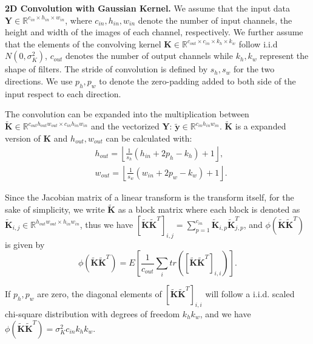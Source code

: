 \documentclass[10pt,journal,compsoc]{IEEEtran}
\begin{document}
\textbf{2D Convolution with Gaussian Kernel.} We assume that the input data $\mathbf{Y}\in \mathbb{R}^{c_{in} \times h_{in} \times w_{in}}$, where $c_{in}, h_{in}, w_{in}$ denote the number of input channels, the height and width of the images of each channel, respectively. We further assume that the elements of the convolving kernel $\mathbf{K}\in \mathbb{R}^{c_{out}\times c_{in}\times k_h \times k_w}$ follow i.i.d $N(0, \sigma_K^2)$, $c_{out}$ denotes the number of output channels while $k_h, k_w$ represent the shape of filters. The stride of convolution is defined by $s_h, s_w$ for the two directions. We use $p_h, p_w$ to denote the zero-padding added to both side of the input respect to each direction.

The convolution can be expanded into the multiplication between $\widetilde{\mathbf{K}}\in \mathbb{R}^{c_{out}h_{out}w_{out}\times c_{in}h_{in}w_{in}}$ and the vectorized $\mathbf{Y}$: $\widetilde{\mathbf{y}}\in \mathbb{R}^{c_{in}h_{in}w_{in}}$. $\widetilde{\mathbf{K}}$ is a expanded version of $\mathbf{K}$ and $h_{out}, w_{out}$ can be calculated with:
\begin{equation}
\begin{split}
    & h_{out} = \left\lfloor \frac{1}{s_h}(h_{in}+2p_{h} - k_h) + 1\right\rfloor,\\
    & w_{out} = \left\lfloor\frac{1}{s_w}(w_{in}+2p_{w} - k_w) + 1\right\rfloor.
\end{split}
\end{equation}

Since the Jacobian matrix of a linear transform is the transform itself, for the sake of simplicity, we write $\widetilde{\mathbf{K}}$ as a block matrix where each block is denoted as $\widetilde{\mathbf{K}}_{i,j} \in \mathbb{R}^{h_{out}w_{out}\times h_{in}w_{in}}$, thus we have $\left[\widetilde{\mathbf{K}}\widetilde{\mathbf{K}}^T\right]_{i,j} = \sum_{p=1}^{c_{in}}\widetilde{\mathbf{K}}_{i,p}\widetilde{\mathbf{K}}_{j,p}^T$, and $\phi\left(\widetilde{\mathbf{K}}\widetilde{\mathbf{K}}^T\right)$ is given by
\begin{equation}
    \phi\left(\widetilde{\mathbf{K}}\widetilde{\mathbf{K}}^T\right) =  E\left[\frac{1}{c_{out}}\sum_itr\left(\left[\widetilde{\mathbf{K}}\widetilde{\mathbf{K}}^T\right]_{i,i}\right)\right].
\end{equation}

If $p_h, p_w$ are zero, the diagonal elements of $\left[\widetilde{\mathbf{K}}\widetilde{\mathbf{K}}^T\right]_{i,i}$ will follow a i.i.d. scaled chi-square distribution with degrees of freedom $k_hk_w$, and we have $\phi\left(\widetilde{\mathbf{K}}\widetilde{\mathbf{K}}^T\right) = \sigma_K^2c_{in}k_hk_w$.
\end{document}
